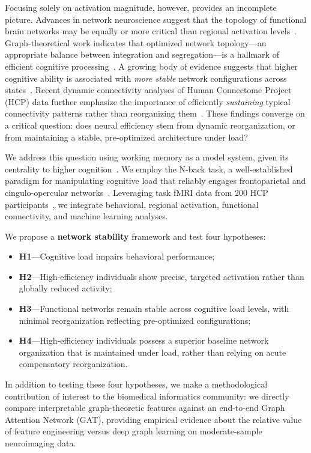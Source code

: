 \documentclass[conference]{IEEEtran}
\begin{document}
Focusing solely on activation magnitude, however, provides an incomplete picture. Advances in network neuroscience suggest that the topology of functional brain networks may be equally or more critical than regional activation levels~\cite{bassett2017network,bullmore2012economy}. Graph-theoretical work indicates that optimized network topology---an appropriate balance between integration and segregation---is a hallmark of efficient cognitive processing~\cite{sporns2016modular}. A growing body of evidence suggests that higher cognitive ability is associated with \emph{more stable} network configurations across states~\cite{shine2016dynamics,schultz2016higher}. Recent dynamic connectivity analyses of Human Connectome Project (HCP) data further emphasize the importance of efficiently \emph{sustaining} typical connectivity patterns rather than reorganizing them~\cite{ng2024dynamic}. These findings converge on a critical question: does neural efficiency stem from dynamic reorganization, or from maintaining a stable, pre-optimized architecture under load?

We address this question using working memory as a model system, given its centrality to higher cognition~\cite{baddeley2012working}. We employ the N-back task, a well-established paradigm for manipulating cognitive load that reliably engages frontoparietal and cingulo-opercular networks~\cite{owen2005n}. Leveraging task fMRI data from 200 HCP participants~\cite{van2013wu,barch2013function}, we integrate behavioral, regional activation, functional connectivity, and machine learning analyses.

We propose a \textbf{network stability} framework and test four hypotheses:
\begin{itemize}
  \item \textbf{H1}---Cognitive load impairs behavioral performance;
  \item \textbf{H2}---High-efficiency individuals show precise, targeted activation rather than globally reduced activity;
  \item \textbf{H3}---Functional networks remain stable across cognitive load levels, with minimal reorganization reflecting pre-optimized configurations;
  \item \textbf{H4}---High-efficiency individuals possess a superior baseline network organization that is maintained under load, rather than relying on acute compensatory reorganization.
\end{itemize}
In addition to testing these four hypotheses, we make a methodological contribution of interest to the biomedical informatics community: we directly compare interpretable graph-theoretic features against an end-to-end Graph Attention Network (GAT), providing empirical evidence about the relative value of feature engineering versus deep graph learning on moderate-sample neuroimaging data.
\end{document}
